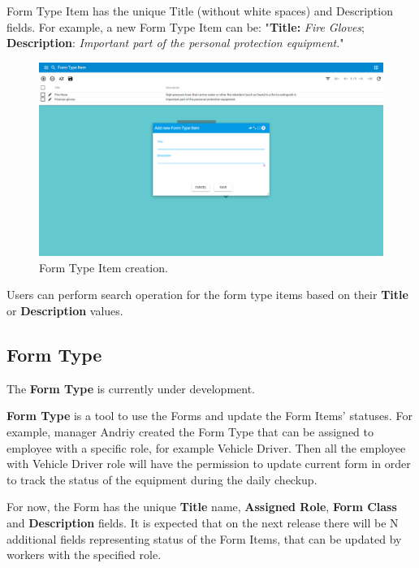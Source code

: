 Form Type Item has the unique Title (without white spaces) and Description fields. For example, a new Form Type Item can be: "\textbf{Title:} \textit{Fire Gloves}; \textbf{Description}: \textit{Important part of the personal protection equipment}."  


    \begin{figure}[!htbp]
	\centering
	\includegraphics[width=0.95\linewidth]{sections/forms/images/add_newform_type_item.png}
	\caption{Form Type Item creation.}\label{sections/forms/images/add_newform_type_item}
	\end{figure}

Users can perform search operation for the form type items based on their \textbf{Title} or \textbf{Description} values.
\newpage

\subsection{Form Type}
The \textbf{Form Type} is currently under development. 

\textbf{Form Type} is a tool to use the Forms and update the Form Items' statuses. For example, manager Andriy created the Form Type that can be assigned to employee with a specific role, for example Vehicle Driver. Then all the employee with Vehicle Driver role will have the permission to update current form in order to track the status of the equipment during the daily checkup. 

For now, the Form has the unique \textbf{Title} name, \textbf{Assigned Role},  \textbf{Form Class} and \textbf{Description} fields. It is expected that on the next release there will be N additional fields representing status of the Form Items, that can be updated by workers with the specified role.

